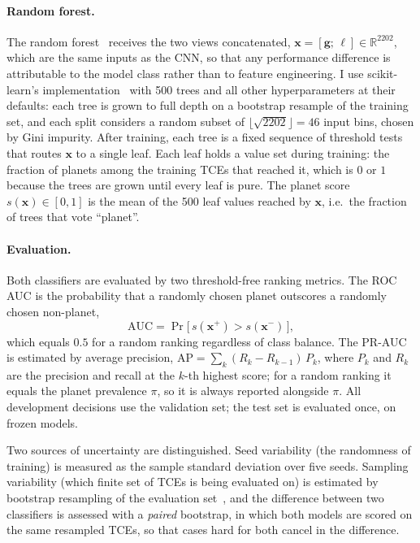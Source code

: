 \documentclass[11pt,a4paper]{article}
\begin{document}
\paragraph{Random forest.}
The random forest~\cite{breiman2001} receives the two views concatenated,
$\mathbf{x} = [\mathbf{g};\, \boldsymbol{\ell}] \in \mathbb{R}^{2202}$, which are the
same inputs as the CNN, so that any performance difference is attributable to the
model class rather than to feature engineering. I use scikit-learn's
implementation~\cite{pedregosa2011} with 500 trees and all other hyperparameters at
their defaults: each tree is grown to full depth on a bootstrap resample of the
training set, and each split considers a random subset of
$\lfloor \sqrt{2202} \rfloor = 46$ input bins, chosen by Gini impurity. After training, each tree is a fixed sequence of threshold tests that routes
$\mathbf{x}$ to a single leaf. Each leaf holds a value set during training: the
fraction of planets among the training TCEs that reached it, which is $0$ or $1$
because the trees are grown until every leaf is pure. The planet score
$s(\mathbf{x}) \in [0, 1]$ is the mean of the 500 leaf values reached by
$\mathbf{x}$, i.e.\ the fraction of trees that vote ``planet''.

\paragraph{Evaluation.}
Both classifiers are evaluated by two threshold-free ranking metrics. The ROC AUC is
the probability that a randomly chosen planet outscores a randomly chosen
non-planet,
\[
  \text{AUC} = \Pr\!\big[\, s(\mathbf{x}^{+}) > s(\mathbf{x}^{-}) \,\big],
\]
which equals $0.5$ for a random ranking regardless of class balance. The PR-AUC is
estimated by average precision,
$\text{AP} = \sum_k (R_k - R_{k-1})\, P_k$, where $P_k$ and $R_k$ are the precision
and recall at the $k$-th highest score; for a random ranking it equals the planet
prevalence $\pi$, so it is always reported alongside $\pi$. All development decisions
use the validation set; the test set is evaluated once, on frozen models.

Two sources of uncertainty are distinguished. Seed variability (the randomness of
training) is measured as the sample standard deviation over five seeds. Sampling
variability (which finite set of TCEs is being evaluated on) is estimated by
bootstrap resampling of the evaluation set~\cite{efron1979}, and the difference
between two classifiers is assessed with a \emph{paired} bootstrap, in which both
models are scored on the same resampled TCEs, so that cases hard for both cancel in
the difference.
\end{document}
